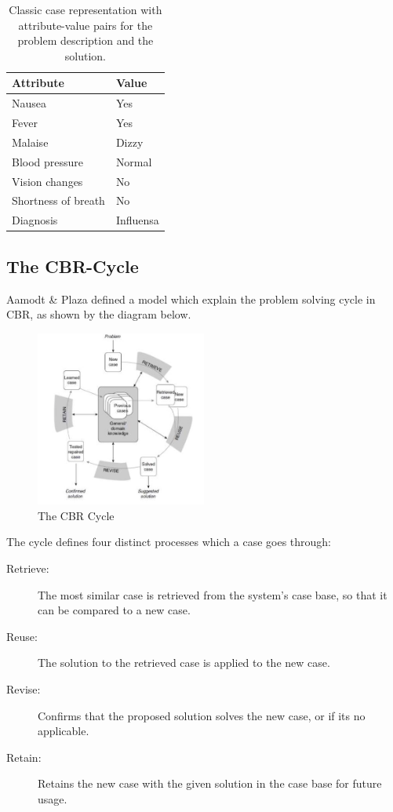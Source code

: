 \begin{table}[H]
\centering
\caption{Classic case representation with attribute-value pairs for the problem description and the solution.}
\label{my-label}
\begin{tabular}{|l|l|}
\hline
\rowcolor[HTML]{C0C0C0} 
Attribute           & Value     \\ \hline
Nausea              & Yes       \\ \hline
Fever               & Yes       \\ \hline
Malaise             & Dizzy     \\ \hline
Blood pressure      & Normal    \\ \hline
Vision changes      & No        \\ \hline
Shortness of breath & No        \\ \hline
Diagnosis           & Influensa \\ \hline
\end{tabular}
\end{table}

\subsection{The CBR-Cycle}

Aamodt & Plaza\cite{aamodt1994case} defined a model which explain the problem solving cycle in CBR, as shown by the diagram below. 

\begin{figure}[H]
    \centering
    \includegraphics[width=0.5\textwidth]{fig/cbr_cycle.jpg}
    \caption{The CBR Cycle}
    \label{fig:cbr_cycle}
\end{figure}

The cycle defines four distinct processes which a case goes through:

\begin{description}
\item [Retrieve:] The most similar case is retrieved from the system's case base, so that it can be compared to a new case.
\item [Reuse:] The solution to the retrieved case is applied to the new case.
\item [Revise:] Confirms that the proposed solution solves the new case, or if its no applicable.
\item [Retain:] Retains the new case with the given solution in the case base for future usage.
\end{description}

